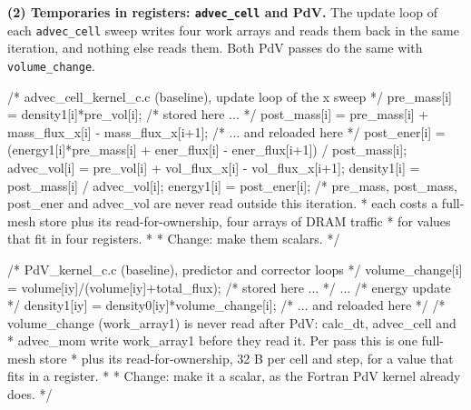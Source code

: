 \documentclass[a4paper,11pt]{article}
\newcommand{\kernel}[1]{\texttt{#1}}
\begin{document}
\textbf{(2) Temporaries in registers: \kernel{advec\_cell} and PdV.}
The update loop of each \kernel{advec\_cell} sweep writes four work arrays and reads them back in the same iteration, and nothing else reads them.
Both PdV passes do the same with \texttt{volume\_change}.
\begin{code}
/* advec_cell_kernel_c.c (baseline), update loop of the x sweep */
pre_mass[i]  = density1[i]*pre_vol[i];                          /* stored here ...        */
post_mass[i] = pre_mass[i] + mass_flux_x[i] - mass_flux_x[i+1]; /* ... and reloaded here  */
post_ener[i] = (energy1[i]*pre_mass[i] + ener_flux[i] - ener_flux[i+1])
               / post_mass[i];
advec_vol[i] = pre_vol[i] + vol_flux_x[i] - vol_flux_x[i+1];
density1[i]  = post_mass[i] / advec_vol[i];
energy1[i]   = post_ener[i];
/* pre_mass, post_mass, post_ener and advec_vol are never read outside this iteration.
 * each costs a full-mesh store plus its read-for-ownership, four arrays of DRAM traffic
 * for values that fit in four registers.
 *
 * Change: make them scalars. */
\end{code}
\begin{code}
/* PdV_kernel_c.c (baseline), predictor and corrector loops */
volume_change[i] = volume[iy]/(volume[iy]+total_flux);  /* stored here ...       */
...                                                      /* energy update         */
density1[iy]     = density0[iy]*volume_change[i];        /* ... and reloaded here */
/* volume_change (work_array1) is never read after PdV: calc_dt, advec_cell and
 * advec_mom write work_array1 before they read it. Per pass this is one full-mesh store
 * plus its read-for-ownership, 32 B per cell and step, for a value that fits in a register.
 *
 * Change: make it a scalar, as the Fortran PdV kernel already does. */
\end{code}
\end{document}

